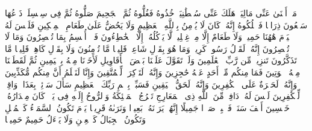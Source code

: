 \startbuffer[\q:69:28]
مَاۤ أَغۡنَىٰ عَنِّی مَالِیَهۡۜ%
\stopbuffer
\startbuffer[\q:69:29]
هَلَكَ عَنِّی سُلۡطَٰنِیَهۡ%
\stopbuffer
\startbuffer[\q:69:30]
خُذُوهُ فَغُلُّوهُ%
\stopbuffer
\startbuffer[\q:69:31]
ثُمَّ ٱلۡجَحِیمَ صَلُّوهُ%
\stopbuffer
\startbuffer[\q:69:32]
ثُمَّ فِی سِلۡسِلَةࣲ ذَرۡعُهَا سَبۡعُونَ ذِرَاعࣰا فَٱسۡلُكُوهُ%
\stopbuffer
\startbuffer[\q:69:33]
إِنَّهُۥ كَانَ لَا یُؤۡمِنُ بِٱللَّهِ ٱلۡعَظِیمِ%
\stopbuffer
\startbuffer[\q:69:34]
وَلَا یَحُضُّ عَلَىٰ طَعَامِ ٱلۡمِسۡكِینِ%
\stopbuffer
\startbuffer[\q:69:35]
فَلَیۡسَ لَهُ ٱلۡیَوۡمَ هَٰهُنَا حَمِیمࣱ%
\stopbuffer
\startbuffer[\q:69:36]
وَلَا طَعَامٌ إِلَّا مِنۡ غِسۡلِینࣲ%
\stopbuffer
\startbuffer[\q:69:37]
لَّا یَأۡكُلُهُۥۤ إِلَّا ٱلۡخَٰطِءُونَ%
\stopbuffer
\startbuffer[\q:69:38]
فَلَاۤ أُقۡسِمُ بِمَا تُبۡصِرُونَ%
\stopbuffer
\startbuffer[\q:69:39]
وَمَا لَا تُبۡصِرُونَ%
\stopbuffer
\startbuffer[\q:69:40]
إِنَّهُۥ لَقَوۡلُ رَسُولࣲ كَرِیمࣲ%
\stopbuffer
\startbuffer[\q:69:41]
وَمَا هُوَ بِقَوۡلِ شَاعِرࣲۚ قَلِیلࣰا مَّا تُؤۡمِنُونَ%
\stopbuffer
\startbuffer[\q:69:42]
وَلَا بِقَوۡلِ كَاهِنࣲۚ قَلِیلࣰا مَّا تَذَكَّرُونَ%
\stopbuffer
\startbuffer[\q:69:43]
تَنزِیلࣱ مِّن رَّبِّ ٱلۡعَٰلَمِینَ%
\stopbuffer
\startbuffer[\q:69:44]
وَلَوۡ تَقَوَّلَ عَلَیۡنَا بَعۡضَ ٱلۡأَقَاوِیلِ%
\stopbuffer
\startbuffer[\q:69:45]
لَأَخَذۡنَا مِنۡهُ بِٱلۡیَمِینِ%
\stopbuffer
\startbuffer[\q:69:46]
ثُمَّ لَقَطَعۡنَا مِنۡهُ ٱلۡوَتِینَ%
\stopbuffer
\startbuffer[\q:69:47]
فَمَا مِنكُم مِّنۡ أَحَدٍ عَنۡهُ حَٰجِزِینَ%
\stopbuffer
\startbuffer[\q:69:48]
وَإِنَّهُۥ لَتَذۡكِرَةࣱ لِّلۡمُتَّقِینَ%
\stopbuffer
\startbuffer[\q:69:49]
وَإِنَّا لَنَعۡلَمُ أَنَّ مِنكُم مُّكَذِّبِینَ%
\stopbuffer
\startbuffer[\q:69:50]
وَإِنَّهُۥ لَحَسۡرَةٌ عَلَى ٱلۡكَٰفِرِینَ%
\stopbuffer
\startbuffer[\q:69:51]
وَإِنَّهُۥ لَحَقُّ ٱلۡیَقِینِ%
\stopbuffer
\startbuffer[\q:69:52]
فَسَبِّحۡ بِٱسۡمِ رَبِّكَ ٱلۡعَظِیمِ%
\stopbuffer
\startbuffer[\q:70:1]
سَأَلَ سَاۤئِلُۢ بِعَذَابࣲ وَاقِعࣲ%
\stopbuffer
\startbuffer[\q:70:2]
لِّلۡكَٰفِرِینَ لَیۡسَ لَهُۥ دَافِعࣱ%
\stopbuffer
\startbuffer[\q:70:3]
مِّنَ ٱللَّهِ ذِی ٱلۡمَعَارِجِ%
\stopbuffer
\startbuffer[\q:70:4]
تَعۡرُجُ ٱلۡمَلَٰۤئِكَةُ وَٱلرُّوحُ إِلَیۡهِ فِی یَوۡمࣲ كَانَ مِقۡدَارُهُۥ خَمۡسِینَ أَلۡفَ سَنَةࣲ%
\stopbuffer
\startbuffer[\q:70:5]
فَٱصۡبِرۡ صَبۡرࣰا جَمِیلًا%
\stopbuffer
\startbuffer[\q:70:6]
إِنَّهُمۡ یَرَوۡنَهُۥ بَعِیدࣰا%
\stopbuffer
\startbuffer[\q:70:7]
وَنَرَىٰهُ قَرِیبࣰا%
\stopbuffer
\startbuffer[\q:70:8]
یَوۡمَ تَكُونُ ٱلسَّمَاۤءُ كَٱلۡمُهۡلِ%
\stopbuffer
\startbuffer[\q:70:9]
وَتَكُونُ ٱلۡجِبَالُ كَٱلۡعِهۡنِ%
\stopbuffer
\startbuffer[\q:70:10]
وَلَا یَسۡءَلُ حَمِیمٌ حَمِیمࣰا%
\stopbuffer
\startbuffer[\q:70:11]
